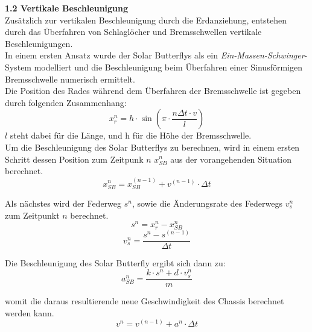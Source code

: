 \begin{description}

  \item \textbf{1.2 Vertikale Beschleunigung}\\
  Zusätzlich zur vertikalen Beschleunigung durch die Erdanziehung, entstehen durch das Überfahren von Schlaglöcher und Bremsschwellen vertikale Beschleunigungen.\\
  In einem ersten Ansatz wurde der Solar Butterflys als ein \emph{Ein-Massen-Schwinger}-System modelliert und die Beschleunigung beim Überfahren einer Sinusförmigen Bremsschwelle numerisch ermittelt.\\

  Die Position des Rades während dem Überfahren der Bremsschwelle ist gegeben durch folgenden Zusammenhang:
  \begin{equation}
    x_r^n = h \cdot \sin(\pi \cdot \frac{n\Delta t \cdot v}{l})
  \end{equation}
  $l$ steht dabei für die Länge, und h für die Höhe der Bremsschwelle.\\

  Um die Beschleunigung des Solar Butterflys zu berechnen, wird in einem ersten Schritt dessen Position zum Zeitpunk $n$ $x_{SB}^n$ aus der vorangehenden Situation berechnet.
  \begin{equation}
    x_{SB}^n = x_{SB}^{(n-1)} + v^{(n-1)} \cdot \Delta t
  \end{equation}

  Als nächstes wird der Federweg $s^n$, sowie die Änderungsrate des Federwegs $v_s^n$ zum Zeitpunkt $n$ berechnet.
  \begin{equation}
    s^n = x_r^n - x_{SB}^n
  \end{equation}
  \begin{equation}
    v_s^n = \frac{s^n - s^{(n-1)}}{\Delta t}
  \end{equation}

  Die Beschleunigung des Solar Butterfly ergibt sich dann zu:\\
  \begin{equation}
    a_{SB}^n = \frac{k \cdot s^n + d \cdot v_s^n}{m}
  \end{equation}

  womit die daraus resultierende neue Geschwindigkeit des Chassis berechnet werden kann.
  \begin{equation}
    v^n = v^{(n-1)} + a^n \cdot \Delta t
  \end{equation}


\end{description}
